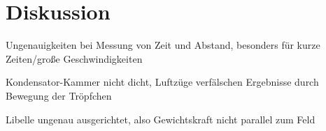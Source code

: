 \section{Diskussion}
\label{sec:diskussion}



Ungenauigkeiten bei Messung von Zeit und Abstand, besonders für kurze Zeiten/große Geschwindigkeiten

Kondensator-Kammer nicht dicht, Luftzüge verfälschen Ergebnisse durch Bewegung der Tröpfchen

Libelle ungenau ausgerichtet, also Gewichtskraft nicht parallel zum Feld
